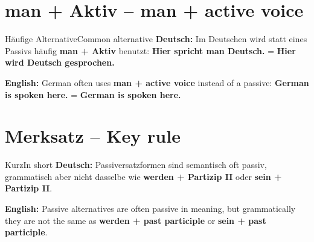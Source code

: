 \documentclass[a4paper,11pt]{article}
\newcommand{\GermanText}[1]{\textbf{Deutsch: }#1\par}
\newcommand{\EnglishText}[1]{{\small\color{SoftGray}\textbf{English: }#1\par}}
\begin{document}
\section{man + Aktiv -- man + active voice}
\begin{grammarentry}{Häufige Alternative}{Common alternative}
\GermanText{Im Deutschen wird statt eines Passivs häufig \textbf{man + Aktiv} benutzt: \textbf{Hier spricht man Deutsch.} = \textbf{Hier wird Deutsch gesprochen.}}
\EnglishText{German often uses \textbf{man + active voice} instead of a passive: \textbf{German is spoken here.} = \textbf{German is spoken here.}}
\end{grammarentry}

\section{Merksatz -- Key rule}
\begin{grammarentry}{Kurz}{In short}
\GermanText{Passiversatzformen sind semantisch oft passiv, grammatisch aber nicht dasselbe wie \textbf{werden + Partizip II} oder \textbf{sein + Partizip II}.}
\EnglishText{Passive alternatives are often passive in meaning, but grammatically they are not the same as \textbf{werden + past participle} or \textbf{sein + past participle}.}
\end{grammarentry}
\end{document}
